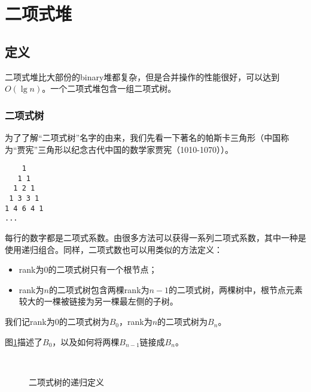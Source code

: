 \documentclass[UTF8]{article}
\begin{document}
\section{二项式堆}
\label{binomail-heap} 


\subsection{定义}

二项式堆比大部份的binary堆都复杂，但是合并操作的性能很好，可以达到$O(\lg n)$。一个二项式堆包含一组二项式树。

\subsubsection{二项式树}
\label{Binomial tree} 

为了了解“二项式树”名字的由来，我们先看一下著名的帕斯卡三角形（中国称为“贾宪”三角形以纪念古代中国的数学家贾宪（1010-1070））\cite{wiki-pascal-triangle}。

\begin{verbatim}
    1
   1 1
  1 2 1
 1 3 3 1
1 4 6 4 1
...
\end{verbatim}

每行的数字都是二项式系数。由很多方法可以获得一系列二项式系数，其中一种是使用递归组合。同样，二项式数也可以用类似的方法定义：

\begin{itemize}
\item rank为0的二项式树只有一个根节点；
\item rank为$n$的二项式树包含两棵rank为$n-1$的二项式树，两棵树中，根节点元素较大的一棵被链接为另一棵最左侧的子树。
\end{itemize}

我们记rank为0的二项式树为$B_0$，rank为$n$的二项式树为$B_n$。

图\ref{fig:link-bitree}描述了$B_0$，以及如何将两棵$B_{n-1}$链接成$B_n$。

\begin{figure}[htbp]
  \centering
   \\
  \caption{二项式树的递归定义} \label{fig:link-bitree}
\end{figure}
\end{document}
